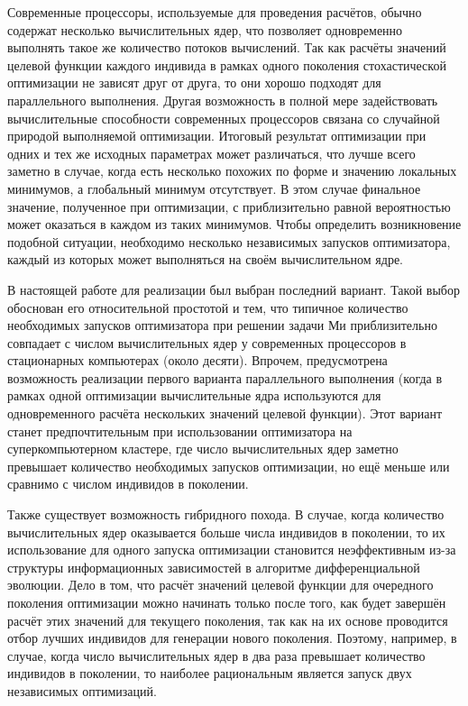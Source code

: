 Современные процессоры, используемые для проведения расчётов, обычно
 содержат несколько вычислительных ядер, что позволяет
одновременно выполнять такое же количество потоков вычислений. Так как расчёты
значений целевой функции каждого индивида в рамках одного
поколения стохастической оптимизации не зависят друг от друга, то они
хорошо подходят для параллельного выполнения. Другая возможность в
полной мере задействовать вычислительные способности современных
процессоров связана со случайной природой выполняемой
оптимизации. Итоговый результат оптимизации при одних и тех же
исходных параметрах может различаться, что лучше всего заметно в
случае, когда есть несколько похожих по форме и значению локальных
минимумов, а глобальный минимум отсутствует. В этом случае финальное
значение, полученное при оптимизации, с приблизительно равной
вероятностью может оказаться в каждом из таких минимумов. Чтобы
определить возникновение подобной ситуации, необходимо несколько
независимых запусков оптимизатора, каждый из которых может выполняться
на своём вычислительном ядре.

В настоящей работе для реализации был выбран последний вариант. Такой
выбор обоснован его относительной простотой и тем, что типичное
количество необходимых запусков оптимизатора при решении
задачи Ми приблизительно совпадает с числом вычислительных ядер у
современных процессоров в стационарных компьютерах (около
десяти). Впрочем, предусмотрена возможность реализации первого
варианта параллельного выполнения (когда в рамках одной оптимизации
вычислительные ядра используются для одновременного расчёта
нескольких значений целевой функции). Этот вариант станет предпочтительным
при использовании оптимизатора на суперкомпьютерном кластере, где число
вычислительных ядер заметно превышает количество необходимых запусков
оптимизации, но ещё меньше или сравнимо с числом индивидов в поколении.

Также существует возможность гибридного похода. В случае, когда
количество вычислительных ядер оказывается больше числа индивидов в
поколении, то их использование для одного запуска оптимизации
становится неэффективным из-за структуры информационных зависимостей в
алгоритме дифференциальной эволюции. Дело в том, что расчёт значений
целевой функции для очередного поколения оптимизации можно начинать
только после того, как будет завершён расчёт этих значений для
текущего поколения, так как на их основе проводится отбор лучших индивидов
для генерации нового поколения. Поэтому,
например, в случае, когда число вычислительных ядер в два раза
превышает количество индивидов в поколении, то наиболее рациональным
является запуск двух независимых оптимизаций.

